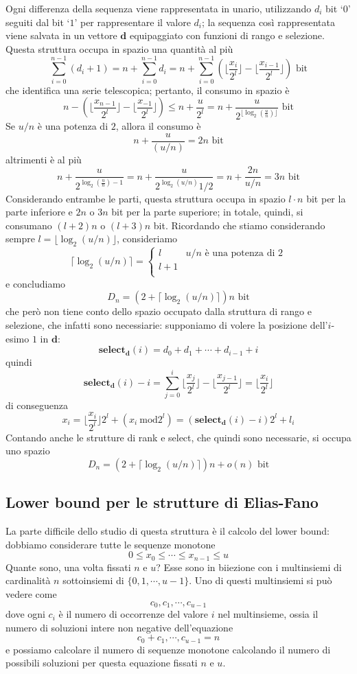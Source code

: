 Ogni differenza della sequenza viene rappresentata in unario, utilizzando $d_i$ bit
`$0$' seguiti dal bit `$1$' per rappresentare il valore $d_i$; la sequenza
così rappresentata viene salvata in un vettore $\mathbf{d}$ equipaggiato
con funzioni di rango e selezione. Questa struttura occupa in spazio
una quantità al più
$$
	\sum_{i = 0}^{n - 1}(d_i + 1) = n + \sum_{i=0}^{n-1} d_i
	= n + \sum_{i = 0}^{n-1} (\lfloor{\frac{x_i}{2^l}}\rfloor - \lfloor{\frac{x_{i-1}}{2^l}}\rfloor) \text{ bit}
$$
che identifica una serie telescopica; pertanto, il consumo in spazio è
$$
	n - (\lfloor{\frac{x_{n-1}}{2^l}}\rfloor -\lfloor{\frac{x_{-1}}{2^l}}\rfloor) \leq n + \frac{u}{2^l}
	= n + \frac{u}{2^{\lfloor \log_2(\frac{u}{n})\rfloor}} \text{ bit}
$$
Se $u/n$ è una potenza di $2$, allora il consumo è
$$
	n + \frac{u}{(u/n)} = 2n \text{ bit}
$$
altrimenti è al più
$$
	n + \frac{u}{2^{\log_2(\frac{u}{n}) - 1 }} = n + \frac{u}{2^{\log_2(u/n)}1/2} = n + \frac{2n}{u/n} = 3n \text{ bit}
$$
Considerando entrambe le parti, questa struttura occupa in spazio $l\cdot n$ bit
per la parte inferiore e $2n$ o $3n$ bit per la parte superiore; in totale,
quindi, si consumano $(l+2)n$ o $(l+3)n$ bit.
Ricordando che stiamo considerando sempre $l = \lfloor \log_2(u/n) \rfloor$, consideriamo
$$
	\lceil \log_2(u/n) \rceil =
	\begin{cases}
		l & u/n \text{ è una potenza di } 2 \\
		l +1                                \\
	\end{cases}
$$
e concludiamo
$$
	D_n = (2 + \lceil \log_2(u/n) \rceil) n \text{ bit}
$$
che però non tiene conto dello spazio occupato dalla struttura di rango e selezione,
che infatti sono necessiarie: supponiamo di volere la posizione dell'$i$-esimo $1$ in $\mathbf{d}$:
$$
	\mathbf{select_d}(i) = d_0 + d_1 + \cdots + d_{i-1} + i
$$
quindi
$$
	\mathbf{select_d}(i) - i = \sum_{j = 0}^i \lfloor{\frac{x_{j}}{2^l}}\rfloor -\lfloor{\frac{x_{j-1}}{2^l}}\rfloor  = \lfloor \frac{x_i}{2^l} \rfloor
$$
di conseguenza
$$
	x_i =  \lfloor \frac{x_i}{2^l} \rfloor 2^l + (x_i ~ \mathrm{mod}{2^l}) = (\mathbf{select_d}(i) - i ) 2^l + l_i
$$
Contando anche le strutture di rank e select, che quindi sono necessarie, si occupa uno spazio
$$
	D_n = (2 + \lceil \log_2(u/n) \rceil)n + o(n) \text{ bit}
$$

\subsection{Lower bound per le strutture di Elias-Fano}
La parte difficile dello studio di questa struttura è il calcolo del lower bound:
dobbiamo considerare tutte le sequenze monotone
$$
	0 \leq x_0 \leq \cdots \leq x_{n-1} \le u
$$
Quante sono, una volta fissati $n$ e $u$? Esse sono in biiezione con i multinsiemi di cardinalità
$n$ sottoinsiemi di $\{0,1, \cdots, u-1\}$. Uno di questi multinsiemi si può vedere come
$$
	c_0, c_1, \cdots, c_{u-1}
$$
dove ogni $c_i$ è il numero di occorrenze del valore $i$ nel multinsieme, ossia
il numero di soluzioni intere non negative dell'equazione
$$
	c_0 + c_1, \cdots, c_{u-1} = n
$$
e possiamo calcolare il numero di sequenze monotone calcolando il numero
di possibili soluzioni per questa equazione fissati $n$ e $u$.

